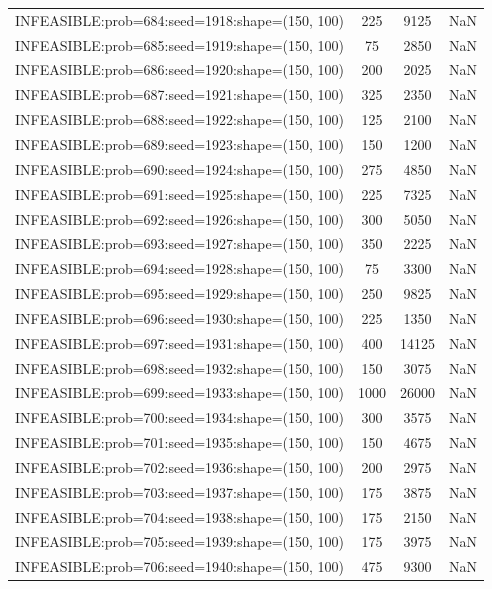 \begin{longtable}{lccc}
INFEASIBLE:prob=684:seed=1918:shape=(150, 100) &      225 &  9125 &    NaN \\
INFEASIBLE:prob=685:seed=1919:shape=(150, 100) &       75 &  2850 &    NaN \\
INFEASIBLE:prob=686:seed=1920:shape=(150, 100) &      200 &  2025 &    NaN \\
INFEASIBLE:prob=687:seed=1921:shape=(150, 100) &      325 &  2350 &    NaN \\
INFEASIBLE:prob=688:seed=1922:shape=(150, 100) &      125 &  2100 &    NaN \\
INFEASIBLE:prob=689:seed=1923:shape=(150, 100) &      150 &  1200 &    NaN \\
INFEASIBLE:prob=690:seed=1924:shape=(150, 100) &      275 &  4850 &    NaN \\
INFEASIBLE:prob=691:seed=1925:shape=(150, 100) &      225 &  7325 &    NaN \\
INFEASIBLE:prob=692:seed=1926:shape=(150, 100) &      300 &  5050 &    NaN \\
INFEASIBLE:prob=693:seed=1927:shape=(150, 100) &      350 &  2225 &    NaN \\
INFEASIBLE:prob=694:seed=1928:shape=(150, 100) &       75 &  3300 &    NaN \\
INFEASIBLE:prob=695:seed=1929:shape=(150, 100) &      250 &  9825 &    NaN \\
INFEASIBLE:prob=696:seed=1930:shape=(150, 100) &      225 &  1350 &    NaN \\
INFEASIBLE:prob=697:seed=1931:shape=(150, 100) &      400 & 14125 &    NaN \\
INFEASIBLE:prob=698:seed=1932:shape=(150, 100) &      150 &  3075 &    NaN \\
INFEASIBLE:prob=699:seed=1933:shape=(150, 100) &     1000 & 26000 &    NaN \\
INFEASIBLE:prob=700:seed=1934:shape=(150, 100) &      300 &  3575 &    NaN \\
INFEASIBLE:prob=701:seed=1935:shape=(150, 100) &      150 &  4675 &    NaN \\
INFEASIBLE:prob=702:seed=1936:shape=(150, 100) &      200 &  2975 &    NaN \\
INFEASIBLE:prob=703:seed=1937:shape=(150, 100) &      175 &  3875 &    NaN \\
INFEASIBLE:prob=704:seed=1938:shape=(150, 100) &      175 &  2150 &    NaN \\
INFEASIBLE:prob=705:seed=1939:shape=(150, 100) &      175 &  3975 &    NaN \\
INFEASIBLE:prob=706:seed=1940:shape=(150, 100) &      475 &  9300 &    NaN \\

\end{longtable}
